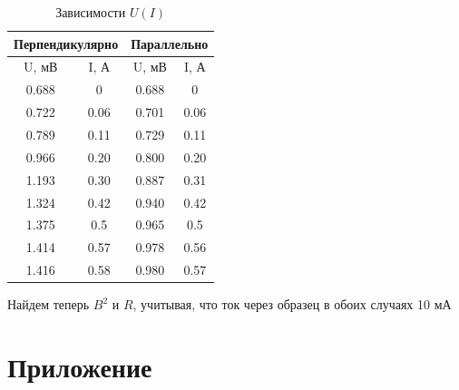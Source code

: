 \documentclass[a4paper, 12pt]{article}
\begin{document}
\begin{table}[H]
\centering
\begin{tabular}{|cc|cc|}
\hline
\multicolumn{2}{|c|}{\textbf{Перпендикулярно}} & \multicolumn{2}{c|}{\textbf{Параллельно}}  \\ \hline
\multicolumn{1}{|c|}{U, мВ}       & I, А       & \multicolumn{1}{c|}{U, мВ} & I, А \\ \hline
\multicolumn{1}{|c|}{0.688}       & 0          & \multicolumn{1}{c|}{0.688} & 0    \\ \hline
\multicolumn{1}{|c|}{0.722}       & 0.06       & \multicolumn{1}{c|}{0.701} & 0.06 \\ \hline
\multicolumn{1}{|c|}{0.789}       & 0.11       & \multicolumn{1}{c|}{0.729} & 0.11 \\ \hline
\multicolumn{1}{|c|}{0.966}       & 0.20       & \multicolumn{1}{c|}{0.800} & 0.20 \\ \hline
\multicolumn{1}{|c|}{1.193}       & 0.30       & \multicolumn{1}{c|}{0.887} & 0.31 \\ \hline
\multicolumn{1}{|c|}{1.324}       & 0.42       & \multicolumn{1}{c|}{0.940} & 0.42 \\ \hline
\multicolumn{1}{|c|}{1.375}       & 0.5        & \multicolumn{1}{c|}{0.965} & 0.5  \\ \hline
\multicolumn{1}{|c|}{1.414}       & 0.57       & \multicolumn{1}{c|}{0.978} & 0.56 \\ \hline
\multicolumn{1}{|c|}{1.416}       & 0.58       & \multicolumn{1}{c|}{0.980} & 0.57 \\ \hline
\end{tabular}
\caption{Зависимости $U(I)$}
\label{tab:plate}
\end{table}

Найдем теперь $B^2$ и $R$, учитывая, что ток через образец в обоих случаях 10 мА

\section{Приложение}
\end{document}
